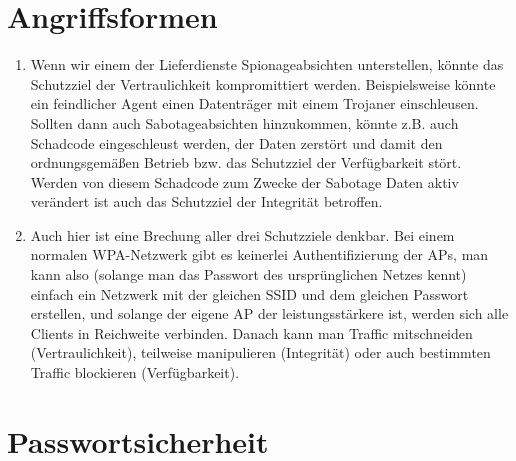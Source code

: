 \documentclass[a4paper,11pt]{scrartcl}
\begin{document}
\section{Angriffsformen}
\label{sec:Angriffsformen}

\begin{enumerate}[1.]
    \item
        Wenn wir einem der Lieferdienste Spionageabsichten unterstellen, könnte
        das Schutzziel der Vertraulichkeit kompromittiert werden. Beispielsweise
        könnte ein feindlicher Agent einen Datenträger mit einem Trojaner
        einschleusen. Sollten dann auch Sabotageabsichten hinzukommen, könnte
        z.B. auch Schadcode eingeschleust werden, der Daten zerstört und damit
        den ordnungsgemäßen Betrieb bzw. das Schutzziel der Verfügbarkeit stört.
        Werden von diesem Schadcode zum Zwecke der Sabotage Daten aktiv verändert
        ist auch das Schutzziel der Integrität betroffen.

    \item
        Auch hier ist eine Brechung aller drei Schutzziele denkbar. Bei einem
        normalen WPA-Netzwerk gibt es keinerlei Authentifizierung der APs,
        man kann also (solange man das Passwort des ursprünglichen Netzes kennt)
        einfach ein Netzwerk mit der gleichen SSID und dem gleichen Passwort
        erstellen, und solange der eigene AP der leistungsstärkere ist, werden
        sich alle Clients in Reichweite verbinden. Danach kann man Traffic
        mitschneiden (Vertraulichkeit), teilweise manipulieren (Integrität)
        oder auch bestimmten Traffic blockieren (Verfügbarkeit).
\end{enumerate}

\section{Passwortsicherheit}
\label{sec:Passwortsicherheit}
\end{document}
